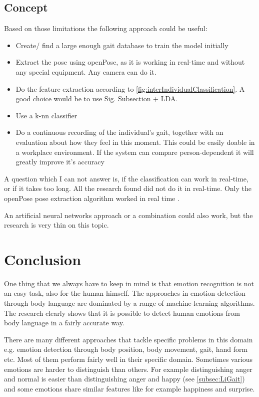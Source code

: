 \documentclass[conference]{IEEEtran}
\begin{document}
\subsection{Concept}
Based on those limitations the following approach could be useful:
\begin{itemize}
\item{Create/ find a large enough gait database to train the model initially}
\item{Extract the pose using openPose\cite{cao2017realtime}, as it is working in real-time and without any special equipment. Any camera can do it.}
\item{Do the feature extraction according to \autoref{fig:interIndividualClassification}. A good choice would be to use Sig. Subsection + LDA\cite{karg2012pattern}}.
\item{Use a k-nn classifier\cite{karg2012pattern}}
\item{Do a continuous recording of the individual's gait, together with an evaluation about how they feel in this moment. This could be easily doable in a workplace environment. If the system can compare person-dependent it will greatly improve it's accuracy}
\end{itemize}

A question which I can not answer is, if the classification can work in real-time, or if it takes too long. All the research found did not do it in real-time. Only the openPose pose extraction algorithm worked in real time \cite{cao2017realtime}.\

An artificial neural networks approach or a combination could also work, but the research is very thin on this topic\cite{janssen2008recognition,karg2012pattern}.



\section{Conclusion}
One thing that we always have to keep in mind is that emotion recognition is not an easy task, also for the human himself\cite{ekman1974detecting,karg2012pattern,schindler2008recognizing}. The approaches in emotion detection through body language are dominated by a range of machine-learning algorithms. The research clearly shows that it is possible to detect human emotions from body language in a fairly accurate way.

There are many different approaches that tackle specific problems in this domain e.g. emotion detection through body position, body movement, gait, hand form etc. Most of them perform fairly well in their specific domain. Sometimes various emotions are harder to distinguish than others. For example distinguishing anger and normal is easier than distinguishing anger and happy\cite{li2016emotion} (see \autoref{subsec:LiGait}) and some emotions share similar features like for example happiness and surprise\cite{kleinsmith2005incremental}.
\end{document}
